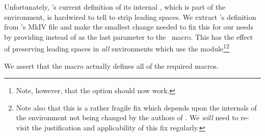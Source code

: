 
\startMkIVCode
\unexpanded{}

\unexpanded{}

\unexpanded{}

\unexpanded{}

\unexpanded{}

\unexpanded{}
\stopMkIVCode

Unfortunately, \ConTeXt's current definition of its internal
, which is part of the
 environment, is hardwired to tell 
to strip leading spaces. We extract 's
definition from \ConTeXt's MkIV file  and make the
smallest change needed to fix this for our needs by providing
\type{\zerocount} instead of \type{\plusone} as the last parameter to the
 \ConTeXt\ macro. This has the effect of preserving
leading spaces in \emph{all}  environments which use
the  module\footnote{Note, however, that the
\type{\setuptyping}  option should now work.}\footnote{Note
also that this is a rather fragile fix which depends upon the internals of
the  environment not being changed by the authors of
\ConTeXt. We \emph{will} need to re-visit the justification and
applicability of this fix regularly.}

\startMkIVCode
\unexpanded{}
\stopMkIVCode


We assert that the  macro actually defines all of
the required macros.

